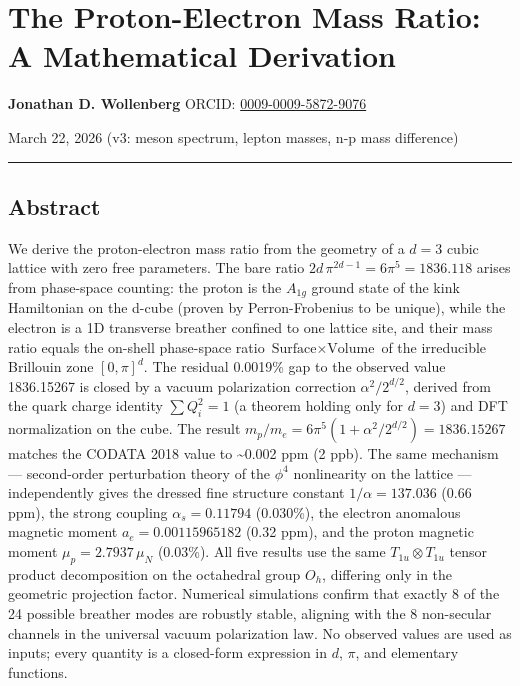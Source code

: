 \documentclass[
]{article}
\author{}
\date{}
\begin{document}
\section{The Proton-Electron Mass Ratio: A Mathematical
Derivation}\label{the-proton-electron-mass-ratio-a-mathematical-derivation}

\textbf{Jonathan D. Wollenberg} ORCID:
\href{https://orcid.org/0009-0009-5872-9076}{0009-0009-5872-9076}

March 22, 2026 (v3: meson spectrum, lepton masses, n-p mass difference)

\begin{center}\rule{0.5\linewidth}{0.5pt}\end{center}

\subsection{Abstract}\label{abstract}

We derive the proton-electron mass ratio from the geometry of a \(d=3\)
cubic lattice with zero free parameters. The bare ratio
\(2d\,\pi^{2d-1} = 6\pi^5 = 1836.118\) arises from phase-space counting:
the proton is the \(A_{1g}\) ground state of the kink Hamiltonian on the
d-cube (proven by Perron-Frobenius to be unique), while the electron is
a 1D transverse breather confined to one lattice site, and their mass
ratio equals the on-shell phase-space ratio
\(\text{Surface} \times \text{Volume}\) of the irreducible Brillouin
zone \([0,\pi]^d\). The residual 0.0019\% gap to the observed value
1836.15267 is closed by a vacuum polarization correction
\(\alpha^2/2^{d/2}\), derived from the quark charge identity
\(\sum Q_i^2 = 1\) (a theorem holding only for \(d=3\)) and DFT
normalization on the cube. The result
\(m_p/m_e = 6\pi^5(1 + \alpha^2/2^{d/2}) = 1836.15267\) matches the
CODATA 2018 value to \textasciitilde0.002 ppm (2 ppb). The same
mechanism --- second-order perturbation theory of the \(\phi^4\)
nonlinearity on the lattice --- independently gives the dressed fine
structure constant \(1/\alpha = 137.036\) (0.66 ppm), the strong
coupling \(\alpha_s = 0.11794\) (0.030\%), the electron anomalous
magnetic moment \(a_e = 0.00115965182\) (0.32 ppm), and the proton
magnetic moment \(\mu_p = 2.7937\,\mu_N\) (0.03\%). All five results use
the same \(T_{1u} \otimes T_{1u}\) tensor product decomposition on the
octahedral group \(O_h\), differing only in the geometric projection
factor. Numerical simulations confirm that exactly 8 of the 24 possible
breather modes are robustly stable, aligning with the 8 non-secular
channels in the universal vacuum polarization law. No observed values
are used as inputs; every quantity is a closed-form expression in \(d\),
\(\pi\), and elementary functions.
\end{document}
